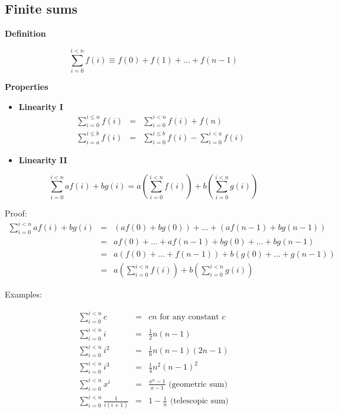 \documentclass[justified, sixbynine]{tufte-book}
\def\subsubsection#1{{\bf #1}}
\theoremstyle{plain}%
\newtheorem * {corollary}{Corollary}
\theoremstyle{definition}
\theoremstyle{remark}
\newtheorem * {remark}{Remark}
\newtheorem * {note}{Note}
\begin{document}
\begin{fullwidth}
\goodbreak\subsection{Finite sums}

\subsubsection{Definition}

\begin{equation}
\sum_{i=0}^{i<n}f(i)\equiv f(0)+f(1)+...+f(n-1)
\end{equation}

\subsubsection{Properties}

\begin{itemize}
\item  {\bf Linearity I}
\begin{eqnarray}
\sum_{i=0}^{i\leq n}f(i) &=&\sum_{i=0}^{i<n}f(i)+f(n) \\
\sum_{i=a}^{i\leq b}f(i) &=&\sum_{i=0}^{i\leq b}f(i)-\sum_{i=0}^{i<a}f(i)
\end{eqnarray}

\item  {\bf Linearity II}
\end{itemize}

\begin{equation}
\sum_{i=0}^{i<n}af(i)+bg(i)=a\left( \sum_{i=0}^{i<n}f(i)\right) +b\left(
\sum_{i=0}^{i<n}g(i)\right)
\end{equation}

Proof:
\begin{eqnarray}
\sum_{i=0}^{i<n}af(i)+bg(i) &=&\left( af(0)+bg(0)\right) +...+\left(
af(n-1)+bg(n-1)\right)  \nonumber \\
&=&af(0)+...+af(n-1)+bg(0)+...+bg(n-1)  \nonumber \\
&=&a\left( f(0)+...+f(n-1)\right) +b\left( g(0)+...+g(n-1)\right)  \nonumber
\\
&=&a\left( \sum_{i=0}^{i<n}f(i)\right) +b\left( \sum_{i=0}^{i<n}g(i)\right)
\end{eqnarray}

Examples:

\begin{eqnarray}
\sum_{i=0}^{i<n}c &=&cn\text{ for any constant }c \\
\sum_{i=0}^{i<n}i &=&\frac 12n(n-1) \\
\sum_{i=0}^{i<n}i^2 &=&\frac 16n(n-1)(2n-1) \\
\sum_{i=0}^{i<n}i^3 &=&\frac 14n^2(n-1)^2 \\
\sum_{i=0}^{i<n}x^i &=&\frac{x^n-1}{x-1}\text{ (geometric sum)} \\
\sum_{i=0}^{i<n}\frac 1{i(i+1)} &=&1-\frac 1n\text{ (telescopic sum)}
\end{eqnarray}


\end{fullwidth}
\end{document}
